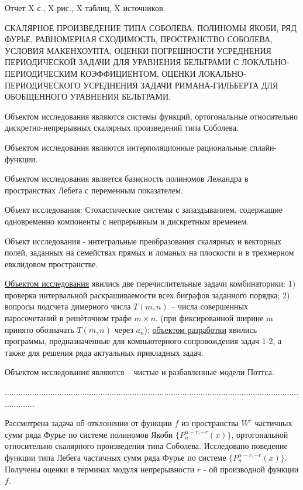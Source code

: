 \Referat %

Отчет X с., X рис., X таблиц, X источников.

\MakeUppercase{скалярное произведение типа Соболева, полиномы Якоби, ряд Фурье, равномерная сходимость, пространство Соболева, условия Макенхоупта,
оценки погрешности усреднения периодической задачи  для уравнения бельтрами
с локально-периодическим коэффициентом, оценки локально-периодического усреднения задачи римана-гильберта для обобщенного уравнения бельтрами.
}

Объектом исследования являются системы функций, ортогональные относительно дискретно-непрерывных скалярных произведений типа Соболева.



Объектом исследования являются интерполяционные рациональные сплайн-функции.

Объектом исследования является базисность полиномов Лежандра в пространствах Лебега с переменным показателем.

Объект исследования:
Стохастические системы с запаздыванием, содержащие одновременно компоненты с непрерывным и дискретным временем.



Объект исследования - интегральные преобразования скалярных и векторных полей, заданных на семействах прямых и ломаных на плоскости и в трехмерном евклидовом пространстве.

\underline{Объектом исследования}
явились две перечислительные задачи комбинаторики: 1) проверка интервальной раскрашиваемости всех биграфов заданного порядка; 2) вопросы подсчета димерного числа $T(m, n)$ -- числа совершенных паросочетаний в решёточном графе $m\times n$. (при фиксированной ширине m принято обозначать $T(m, n)$ через $a_n$); \underline{объектом разработки} явились программы, предназначенные для компьютерного сопровождения задач 1-2, а также для решения ряда актуальных прикладных задач.

Объектом исследования являются – чистые и разбавленные модели Поттса.

..............................................................................................................................................


Рассмотрена задача об отклонении от функции $f$ из пространства $W^r$ частичных сумм ряда Фурье по системе полиномов Якоби $\{P_n^{\alpha-r,-r}(x)\}$, ортогональной относительно скалярного произведения типа Соболева. Исследовано поведение функции типа Лебега частичных сумм ряда Фурье по системе $\{P_n^{\alpha-r,-r}(x)\}$. Получены оценки в терминах модуля непрерывности $r$ - ой производной функции $f$.

